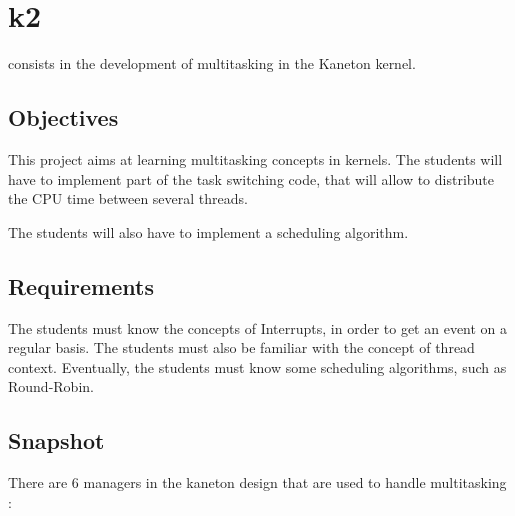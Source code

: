 %
%
%
%
%
%

%
%

\chapter{k2}
\label{chapter:k2}

 consists in the development of multitasking in the Kaneton kernel.

\newpage

%
%

%
%

\section{Objectives}

This project aims at learning multitasking concepts in kernels. The students will have to implement part of the task switching code, that will allow to distribute the CPU time between several threads.

The students will also have to implement a scheduling algorithm.

%
%

\section{Requirements}

The students must know the concepts of Interrupts, in order to get an event on a regular basis. The students must also be familiar with the concept of thread context. Eventually, the students must know some scheduling algorithms, such as Round-Robin.

%
%

\section{Snapshot}

There are 6 managers in the kaneton design that are used to handle multitasking :

